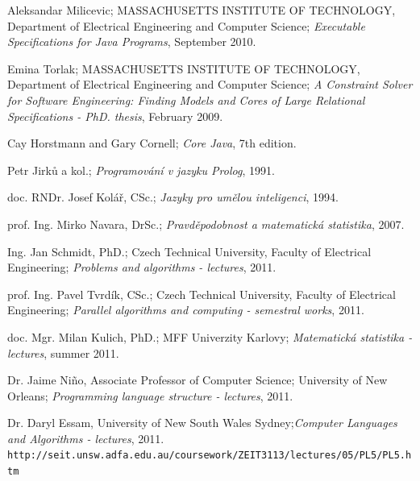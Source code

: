 \documentclass[11pt,twoside,a4paper]{book}
\begin{document}
\begin{thebibliography}{1}

Aleksandar Milicevic; MASSACHUSETTS INSTITUTE OF TECHNOLOGY, Department of
Electrical Engineering and Computer Science; \textit{Executable Specifications
for Java Programs}, September 2010.

Emina Torlak; MASSACHUSETTS INSTITUTE OF TECHNOLOGY, Department of
Electrical Engineering and Computer Science; \textit{A Constraint Solver for
Software Engineering: Finding Models and Cores of Large Relational
Specifications - PhD. thesis}, February 2009.


Cay Horstmann and Gary Cornell; \textit{Core Java}, 7th edition.

Petr Jirků a kol.; \textit{Programování v jazyku Prolog}, 1991.

doc. RNDr. Josef Kolář, CSc.; \textit{Jazyky pro umělou inteligenci}, 1994.


prof. Ing. Mirko Navara, DrSc.; \textit{Pravděpodobnost a matematická
statistika}, 2007.


Ing. Jan Schmidt, PhD.; Czech Technical University, Faculty of Electrical
Engineering; \textit{Problems and algorithms - lectures}, 2011.


prof. Ing. Pavel Tvrdík, CSc.; Czech Technical University, Faculty of Electrical
Engineering; \textit{Parallel algorithms and computing - semestral works}, 2011.

doc. Mgr. Milan Kulich, PhD.; MFF
Univerzity Karlovy; \textit{Matematická statistika - lectures}, summer 2011.


Dr. Jaime Niño, Associate Professor of Computer Science; University of New
Orleans; \textit{Programming language structure - lectures}, 2011.

Dr. Daryl Essam, University of New South Wales
Sydney;\textit{Computer Languages and Algorithms - lectures}, 2011.\\
\verb|http://seit.unsw.adfa.edu.au/coursework/ZEIT3113/lectures/05/PL5/PL5.htm|



\end{thebibliography}
\end{document}
